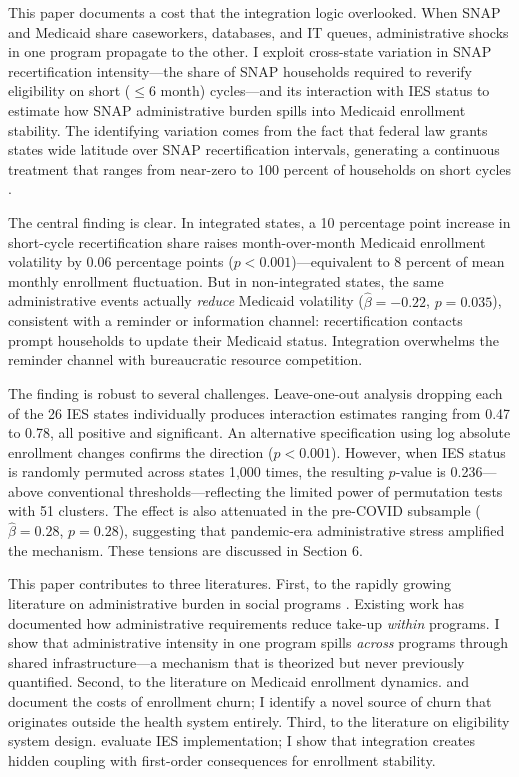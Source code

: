 \documentclass[12pt]{article}
\begin{document}
This paper documents a cost that the integration logic overlooked. When SNAP and Medicaid share caseworkers, databases, and IT queues, administrative shocks in one program propagate to the other. I exploit cross-state variation in SNAP recertification intensity---the share of SNAP households required to reverify eligibility on short ($\leq$6 month) cycles---and its interaction with IES status to estimate how SNAP administrative burden spills into Medicaid enrollment stability. The identifying variation comes from the fact that federal law grants states wide latitude over SNAP recertification intervals, generating a continuous treatment that ranges from near-zero to 100 percent of households on short cycles \citep{usda2024}.

The central finding is clear. In integrated states, a 10 percentage point increase in short-cycle recertification share raises month-over-month Medicaid enrollment volatility by 0.06 percentage points ($p < 0.001$)---equivalent to 8 percent of mean monthly enrollment fluctuation. But in non-integrated states, the same administrative events actually \textit{reduce} Medicaid volatility ($\hat{\beta} = -0.22$, $p = 0.035$), consistent with a reminder or information channel: recertification contacts prompt households to update their Medicaid status. Integration overwhelms the reminder channel with bureaucratic resource competition.

The finding is robust to several challenges. Leave-one-out analysis dropping each of the 26 IES states individually produces interaction estimates ranging from 0.47 to 0.78, all positive and significant. An alternative specification using log absolute enrollment changes confirms the direction ($p < 0.001$). However, when IES status is randomly permuted across states 1,000 times, the resulting $p$-value is 0.236---above conventional thresholds---reflecting the limited power of permutation tests with 51 clusters. The effect is also attenuated in the pre-COVID subsample ($\hat{\beta} = 0.28$, $p = 0.28$), suggesting that pandemic-era administrative stress amplified the mechanism. These tensions are discussed in Section 6.

This paper contributes to three literatures. First, to the rapidly growing literature on administrative burden in social programs \citep{herd2018, moynihan2015, finkelstein2019}. Existing work has documented how administrative requirements reduce take-up \textit{within} programs. I show that administrative intensity in one program spills \textit{across} programs through shared infrastructure---a mechanism that is theorized \citep{chcs2024, bdt2024} but never previously quantified. Second, to the literature on Medicaid enrollment dynamics. \citet{sommers2012} and \citet{sommers2022} document the costs of enrollment churn; I identify a novel source of churn that originates outside the health system entirely. Third, to the literature on eligibility system design. \citet{fox2020} evaluate IES implementation; I show that integration creates hidden coupling with first-order consequences for enrollment stability.
\end{document}
